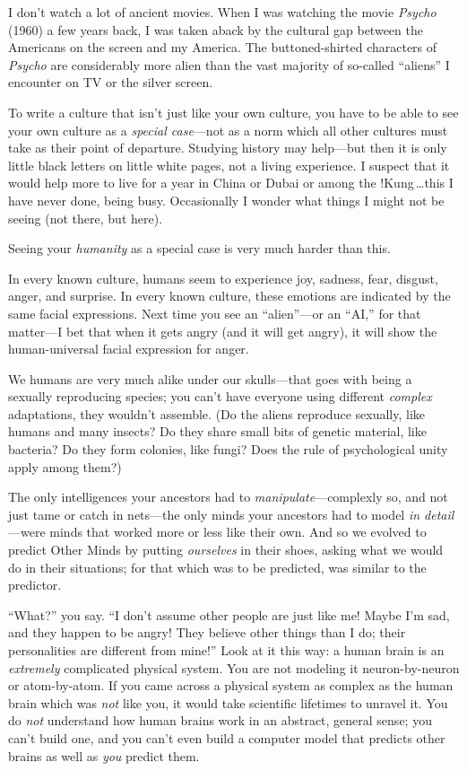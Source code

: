 {{
 I don't watch a lot of ancient movies. When I was
watching the movie \textit{Psycho} (1960) a few years back, I was taken
aback by the cultural gap between the Americans on the screen and my
America. The buttoned-shirted characters of \textit{Psycho} are
considerably more alien than the vast majority of so-called
``aliens'' I encounter on TV or the
silver screen.}

{
 To write a culture that isn't just like your own
culture, you have to be able to see your own culture as a
\textit{special case}{}---not as a norm which all other cultures must
take as their point of departure. Studying history may help---but then
it is only little black letters on little white pages, not a living
experience. I suspect that it would help more to live for a year in
China or Dubai or among the !Kung\,\ldots this I have never done, being
busy. Occasionally I wonder what things I might not be seeing (not
there, but here).}

{
 Seeing your \textit{humanity} as a special case is very much
harder than this.}

{
 In every known culture, humans seem to experience joy, sadness,
fear, disgust, anger, and surprise. In every known culture, these
emotions are indicated by the same facial expressions. Next time you
see an ``alien''---or an
``AI,'' for that matter---I bet that
when it gets angry (and it will get angry), it will show the
human-universal facial expression for anger.}

{
 We humans are very much alike under our skulls---that goes with
being a sexually reproducing species; you can't have
everyone using different \textit{complex} adaptations, they
wouldn't assemble. (Do the aliens reproduce sexually,
like humans and many insects? Do they share small bits of genetic
material, like bacteria? Do they form colonies, like fungi? Does the
rule of psychological unity apply among them?)}

{
 The only intelligences your ancestors had to
\textit{manipulate}{}---complexly so, and not just tame or catch in
nets---the only minds your ancestors had to model \textit{in
detail}{}---were minds that worked more or less like their own. And so
we evolved to predict Other Minds by putting \textit{ourselves} in
their shoes, asking what we would do in their situations; for that
which was to be predicted, was similar to the predictor.}

{
 ``What?'' you say.
``I don't assume other people are just
like me! Maybe I'm sad, and they happen to be angry!
They believe other things than I do; their personalities are different
from mine!'' Look at it this way: a human brain is an
\textit{extremely} complicated physical system. You are not modeling it
neuron-by-neuron or atom-by-atom. If you came across a physical system
as complex as the human brain which was \textit{not} like you, it would
take scientific lifetimes to unravel it. You do \textit{not} understand
how human brains work in an abstract, general sense; you
can't build one, and you can't even
build a computer model that predicts other brains as well as
\textit{you} predict them.}

}
